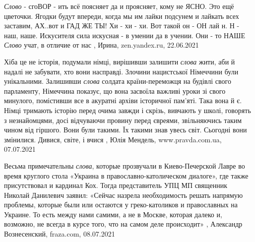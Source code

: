 \emph{Слово} - сгоВОР - ить всё поясняет да и проясняет, кому не ЯСНО.  Это ещё
цветочки. Ягодки будут впереди, когда мы им лайки подсунем и лайкать всех
заставим, АХ..вот и ГАД ЖЕ ТЫ! Хи - хи - хи. Вот такой он - ОН лай н. Н - наш,
наше. Искусителя сила искусная - в умении да в учении. Они - то НАШЕ \emph{Слово}
учат, в отличие от нас
, 
Ирина, zen.yandex.ru, 22.06.2021

Хіба це не історія, подумали німці, вирішивши залишити \emph{слова} жити, аби й надалі
не забувати, хто вони насправді.  Злочини нацистської Німеччини були
унікальними. Залишивши \emph{слова} солдата країни-переможця на будівлі свого
парламенту, Німеччина показує, що вона засвоїла важливі уроки зі свого
минулого, помістивши все в акуратні архіви історичної пам’яті. Така вона й є.
Німці тримають історію перед очима завжди і скрізь, вивчають у школі, говорять
з незнайомцями, досі відчуваючи провину перед євреями, звільняючись таким чином
від гіршого. Вони були такими. Їх такими знав увесь світ. Сьогодні вони
змінилися. Дивися, світе, і вчися
, 
Юлія Мендель, www.pravda.com.ua, 07.07.2021

Весьма примечательны \emph{слова}, которые прозвучали в Киево-Печерской Лавре во время
круглого стола «Украина в православно-католическом диалоге», где также
присутствовал и кардинал Кох. Тогда представитель УПЦ МП священник Николай
Данилевич заявил: «Сейчас назрела необходимость решать напрямую проблемы,
которые были или остаются у греко-католиков и православных на Украине. То есть
между нами самими, а не в Москве, которая далеко и, возможно, не всегда в курсе
того, что на самом деле происходит»
, 
Александр Вознесенский, fraza.com, 08.07.2021

